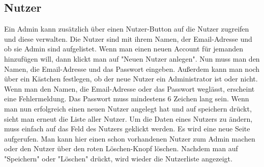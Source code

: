 \subsection{Nutzer}
Ein Admin kann zusätzlich über einen Nutzer-Button auf die Nutzer zugreifen und diese verwalten. Die Nutzer sind mit ihrem Namen, der Email-Adresse und ob sie Admin sind aufgelistet. Wenn man einen neuen Account für jemanden hinzufügen will, dann klickt man auf "Neuen Nutzer anlegen". Nun muss man den Namen, die Email-Adresse und das Passwort eingeben. Außerdem kann man noch über ein Kästchen festlegen, ob der neue Nutzer ein Administrator ist oder nicht. Wenn man den Namen, die Email-Adresse oder das Passwort weglässt, erscheint eine Fehlermeldung. Das Passwort muss mindestens 6 Zeichen lang sein. Wenn man nun erfolgreich einen neuen Nutzer angelegt hat und auf speichern drückt, sieht man erneut die Liste aller Nutzer. Um die Daten eines Nutzers zu ändern, muss einfach auf das Feld des Nutzers geklickt werden. Es wird eine neue Seite aufgerufen. Man kann hier einen schon vorhandenen Nutzer zum Admin machen oder den Nutzer über den roten Löschen-Knopf löschen. Nachdem man auf "Speichern" oder "Löschen" drückt, wird wieder die Nutzerliste angezeigt. 